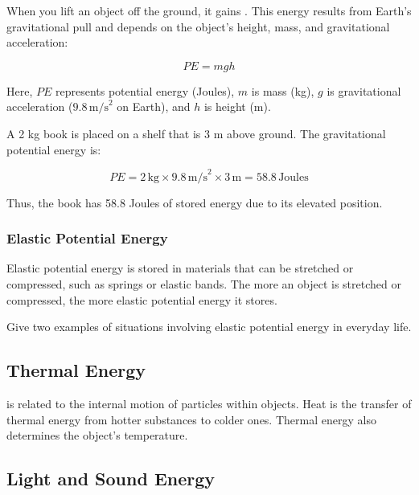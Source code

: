 When you lift an object off the ground, it gains . This energy results from Earth's gravitational pull and depends on the object's height, mass, and gravitational acceleration:

\[
PE = mgh
\]

Here, $PE$ represents potential energy (Joules), $m$ is mass (kg), $g$ is gravitational acceleration ($9.8\,\text{m/s}^2$ on Earth), and $h$ is height (m).

\begin{example}
A 2 kg book is placed on a shelf that is 3 m above ground. The gravitational potential energy is:

\[
PE = 2\,\text{kg} \times 9.8\,\text{m/s}^2 \times 3\,\text{m} = 58.8\,\text{Joules}
\]

Thus, the book has 58.8 Joules of stored energy due to its elevated position.
\end{example}

\subsubsection{Elastic Potential Energy}

Elastic potential energy is stored in materials that can be stretched or compressed, such as springs or elastic bands. The more an object is stretched or compressed, the more elastic potential energy it stores.

\begin{stopandthink}
Give two examples of situations involving elastic potential energy in everyday life.
\end{stopandthink}

\subsection{Thermal Energy}

 is related to the internal motion of particles within objects. Heat is the transfer of thermal energy from hotter substances to colder ones. Thermal energy also determines the object's temperature.


\subsection{Light and Sound Energy}

